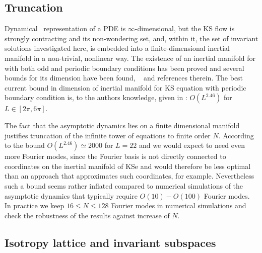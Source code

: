 \subsection{Truncation}

Dynamical \statesp\ representation of a PDE is $\infty$-dimensional,
but the KS flow is strongly contracting and its non-wondering set,
and, within it, the set of invariant solutions investigated here, is
embedded into a finite-dimensional inertial manifold in
a non-trivial, nonlinear way. The existence of an inertial manifold for
\KSe with both odd and periodic boundary conditions has been proved and
several bounds for its dimension have been found, \cf\  and references
therein. The best current bound in dimension of inertial manifold for KS
equation with periodic boundary condition is, to the authors knowledge,
given in : $O(L^{2.46})$ for $L\in[2\pi,6\pi]$.

The fact that the asymptotic dynamics lies on a finite
dimensional manifold justifies truncation of the infinite tower
of equations  to finite order $N$. According to
the bound $O(L^{2.46})\simeq2000$ for $L=22$ and we would expect to need even more
Fourier modes, since the Fourier basis is not directly
connected to coordinates on the inertial manifold of KSe and
would therefore be less optimal than an approach that
approximates such coordinates, for
example.
Nevertheless such a bound seems rather inflated compared to
numerical simulations of the asymptotic dynamics that typically
require $O(10)-O(100)$ Fourier modes. In practice we keep
$16\leq N \leq 128$ Fourier modes in numerical simulations and
check the robustness of the results against increase of $N$.

\subsection{Isotropy lattice and invariant subspaces}
\label{sec:ksIso}


